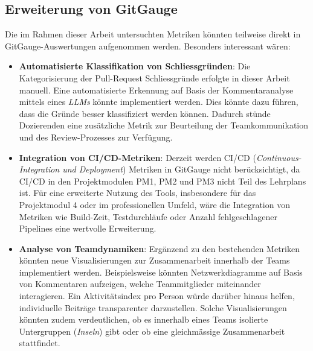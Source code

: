 \subsection{Erweiterung von GitGauge}
Die im Rahmen dieser Arbeit untersuchten Metriken könnten teilweise direkt in GitGauge-Auswertungen aufgenommen werden. Besonders interessant wären:
\begin{itemize}
\item \textbf{Automatisierte Klassifikation von Schliessgründen}: Die Kategorisierung der Pull-Request Schliessgründe erfolgte in dieser Arbeit manuell. Eine automatisierte Erkennung auf Basis der Kommentaranalyse mittels eines \textit{LLMs} könnte implementiert werden. Dies könnte dazu führen, dass die Gründe besser klassifiziert werden können. Dadurch stünde Dozierenden eine zusätzliche Metrik zur Beurteilung der Teamkommunikation und des Review-Prozesses zur Verfügung.
\item \textbf{Integration von CI/CD-Metriken}: Derzeit werden CI/CD (\textit{Continuous-Integrat\-ion und Deployment}) Metriken in GitGauge nicht berücksichtigt, da CI/CD in den Projektmodulen PM1, PM2 und PM3 nicht Teil des Lehrplans ist. Für eine erweiterte Nutzung des Tools, insbesondere für das Projektmodul 4 oder im professionellen Umfeld, wäre die Integration von Metriken wie Build-Zeit, Testdurchläufe oder Anzahl fehlgeschlagener Pipelines eine wertvolle Erweiterung.
\item \textbf{Analyse von Teamdynamiken}: Ergänzend zu den bestehenden Metriken könnten neue Visualisierungen zur Zusammenarbeit innerhalb der Teams implementiert werden. Beispielsweise könnten Netzwerkdiagramme auf Basis von Kommentaren aufzeigen, welche Teammitglieder miteinander interagieren. Ein Aktivitätsindex pro Person würde darüber hinaus helfen, individuelle Beiträge transparenter darzustellen. Solche Visualisierungen könnten zudem verdeutlichen, ob es innerhalb eines Teams isolierte Untergruppen (\textit{Inseln}) gibt oder ob eine gleichmässige Zusammenarbeit stattfindet.
\end{itemize}

